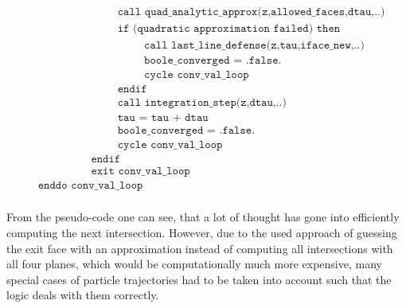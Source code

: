 \documentclass[./main.tex]{subfiles}
\begin{document}
\begin{align*}
&\hspace{3cm} \texttt{call quad\_analytic\_approx(z,allowed\_faces,dtau,..)}\nonumber\\
&\hspace{3cm} \texttt{if (quadratic approximation failed) then}\nonumber\\
&\hspace{4cm} \texttt{call last\_line\_defense(z,tau,iface\_new,..)}\nonumber\\
&\hspace{4cm} \texttt{boole\_converged = .false.}\nonumber\\
&\hspace{4cm} \texttt{cycle conv\_val\_loop}\nonumber\\
&\hspace{3cm} \texttt{endif}\nonumber\\
&\hspace{3cm} \texttt{call integration\_step(z,dtau,..)}\nonumber\\
&\hspace{3cm} \texttt{tau = tau + dtau}\nonumber\\
&\hspace{3cm} \texttt{boole\_converged = .false.}\nonumber\\
&\hspace{3cm} \texttt{cycle conv\_val\_loop}\nonumber\\
&\hspace{2cm} \texttt{endif}\nonumber\\
&\hspace{2cm} \texttt{exit conv\_val\_loop}\nonumber\\
&\texttt{enddo conv\_val\_loop}\nonumber\\
\end{align*}

From the pseudo-code one can see, that a lot of thought has gone into efficiently computing the next intersection. However, due to the used approach of guessing the exit face with an approximation instead of computing all intersections with all four planes, which would be computationally much more expensive, many special cases of particle trajectories had to be taken into account such that the logic deals with them correctly.
\end{document}
